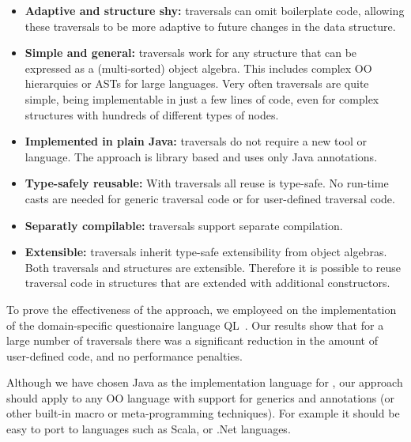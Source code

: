 \begin{itemize}

\item {\bf Adaptive and structure shy:} \name traversals can omit boilerplate
code, allowing these traversals to be more adaptive to future changes in the 
data structure.

\item {\bf Simple and general:} \name traversals work for any
  structure that can be expressed as a (multi-sorted) object
  algebra. This includes complex OO hierarquies or ASTs for large
  languages. Very often traversals are quite simple, being
  implementable in just a few lines of code, even for complex
  structures with hundreds of different types of nodes.

\item {\bf Implemented in plain Java:} \name traversals do not require
  a new tool or language. The approach is library based and uses only
  Java annotations. 

\item {\bf Type-safely reusable:} With \name traversals all reuse is
  type-safe. No run-time casts are needed for generic traversal code
  or for user-defined traversal code.

\item {\bf Separatly compilable:} \name traversals support separate 
  compilation. 

\item {\bf Extensible:} \name traversals inherit type-safe
  extensibility from object algebras. Both traversals and structures
  are extensible. Therefore it is possible to
  reuse traversal code in structures that are extended with additional
  constructors.


\end{itemize}

To prove the effectiveness of the approach, we employeed \name 
on the implementation of the domain-specific questionaire 
language QL~\cite{gouseti14extensible}. 
Our results show that for a large number of traversals 
there was a significant reduction in the amount of user-defined code, and no
performance penalties.

Although we have chosen Java as the implementation language for \Name,
our approach should apply to any OO language with support for generics
and annotations (or other built-in macro or meta-programming techniques). 
For example it should be easy to port \name to languages such as Scala, 
or .Net languages.

